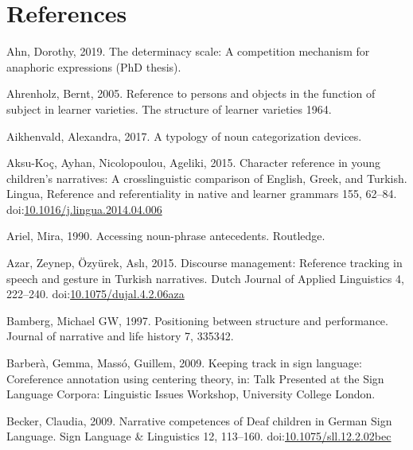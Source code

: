 \documentclass[]{elsarticle} %
\newlength{\cslhangindent}
\newenvironment{CSLReferences}[2] %
 {%
  \setlength{\parindent}{0pt}
  \ifodd #1 \everypar{\setlength{\hangindent}{\cslhangindent}}\ignorespaces\fi
  \ifnum #2 > 0
  \setlength{\parskip}{#2\baselineskip}
  \fi
 }%
 {}
\begin{document}
\clearpage

\hypertarget{references}{%
\section*{References}\label{references}}

\hypertarget{refs}{}
\begin{CSLReferences}{1}{0}
\leavevmode{}%
Ahn, Dorothy, 2019. The determinacy scale: A competition mechanism for
anaphoric expressions (PhD thesis).

\leavevmode{}%
Ahrenholz, Bernt, 2005. Reference to persons and objects in the function
of subject in learner varieties. The structure of learner varieties
1964.

\leavevmode{}%
Aikhenvald, Alexandra, 2017. A typology of noun categorization devices.

\leavevmode{}%
Aksu-Koç, Ayhan, Nicolopoulou, Ageliki, 2015. Character reference in
young children's narratives: A crosslinguistic comparison of English,
Greek, and Turkish. Lingua, Reference and referentiality in native and
learner grammars 155, 62--84.
doi:\href{https://doi.org/10.1016/j.lingua.2014.04.006}{10.1016/j.lingua.2014.04.006}

\leavevmode{}%
Ariel, Mira, 1990. Accessing noun-phrase antecedents. Routledge.

\leavevmode{}%
Azar, Zeynep, Özyürek, Aslı, 2015. Discourse management: Reference
tracking in speech and gesture in Turkish narratives. Dutch Journal of
Applied Linguistics 4, 222--240.
doi:\href{https://doi.org/10.1075/dujal.4.2.06aza}{10.1075/dujal.4.2.06aza}

\leavevmode{}%
Bamberg, Michael GW, 1997. Positioning between structure and
performance. Journal of narrative and life history 7, 335342.

\leavevmode{}%
Barberà, Gemma, Massó, Guillem, 2009. Keeping track in sign language:
Coreference annotation using centering theory, in: Talk Presented at the
Sign Language Corpora: Linguistic Issues Workshop, University College
London.

\leavevmode{}%
Becker, Claudia, 2009. Narrative competences of Deaf children in German
Sign Language. Sign Language \& Linguistics 12, 113--160.
doi:\href{https://doi.org/10.1075/sll.12.2.02bec}{10.1075/sll.12.2.02bec}


\end{CSLReferences}
\end{document}
